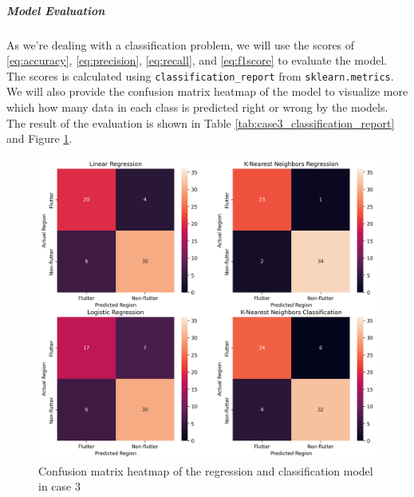 \documentclass[conf]{new-aiaa}
\begin{document}
\subparagraph{Model Evaluation} As we're dealing with a classification problem, we will use the scores of \eqref{eq:accuracy}, \eqref{eq:precision}, \eqref{eq:recall}, and \eqref{eq:f1score} to evaluate the model. The scores is calculated using \texttt{classification\_report} from \texttt{sklearn.metrics}. We will also provide the confusion matrix heatmap of the model to visualize more which how many data in each class is predicted right or wrong by the models. The result of the evaluation is shown in Table \ref{tab:case3_classification_report} and Figure \ref{fig:case3_confusion}.
\begin{figure}[H]
    \centering
    \includegraphics[width=1.0\textwidth]{graph/case3_confusion.png}
    \caption{Confusion matrix heatmap of the regression and classification model in case 3}
    \label{fig:case3_confusion}
\end{figure}
\end{document}
